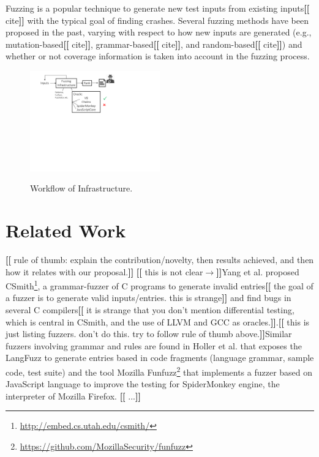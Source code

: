 \documentclass[11pt]{article}
\newcommand{\eg}{e.g.}
\newcommand{\Fix}[1]{\textbf{[[}{\color{red} #1}\textbf{]]}}
\newcommand{\Mar}[1]{\textbf{[[}{\color{blue} #1}\textbf{]]}}
\begin{document}
Fuzzing is a popular technique to generate new test inputs from
existing inputs\Fix{cite} with the typical goal of finding
crashes. Several fuzzing methods have been proposed in the past,
varying with respect to how new inputs are generated (\eg{},
mutation-based\Fix{cite}, grammar-based\Fix{cite}, and
random-based\Fix{cite}) and whether or not coverage information is
taken into account in the fuzzing process.


\begin{figure}[htbp]
  \centering
  \includegraphics[trim=0 350 200 0,clip,width=0.5\textwidth]{google-awards-workflow}
  \label{fig:workflow}
  \caption{Workflow of Infrastructure.}
\end{figure}


\section{Related Work}

\Mar{rule of thumb: explain the
  contribution/novelty, then results achieved, and then how it relates
with our proposal.}
\Mar{this is not clear$\rightarrow$}Yang et al. \cite{yang-2011-finding} proposed CSmith\footnote{\url{http://embed.cs.utah.edu/csmith/}}, a grammar-fuzzer 
of C programs to generate invalid entries\Fix{the goal of a
  fuzzer is to generate valid inputs/entries. this is strange} and
find bugs in several C compilers\Fix{it is strange that you don't mention differential
  testing, which is central in CSmith, and the use of LLVM and GCC as
  oracles.}.\Mar{this is just listing fuzzers. don't do this. try to
  follow rule of thumb above.}Similar fuzzers involving grammar and rules are found in Holler et al. \cite{holler-2012-fuzzing} 
that exposes the LangFuzz to generate entries based in code fragments 
(language grammar, sample code, test suite) and the tool Mozilla 
Funfuzz\footnote{\url{https://github.com/MozillaSecurity/funfuzz}}
that implements a fuzzer based on JavaScript language to improve the 
testing for SpiderMonkey engine, the interpreter of Mozilla Firefox.
\Fix{...}
\end{document}
